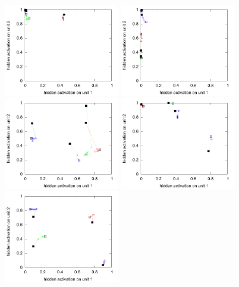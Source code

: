 \begin{figure}[h]
  \centering
  \includegraphics[width=0.45\textwidth]{img/hid-bal-bad-init.pdf}  
  \includegraphics[width=0.45\textwidth]{img/hid-bal-bad-convex.pdf}  \\
  \includegraphics[width=0.45\textwidth]{img/hid-bal-bad-step.pdf}  
  \includegraphics[width=0.45\textwidth]{img/hid-bal-bad-stagnation.pdf}  \\
  \includegraphics[width=0.45\textwidth]{img/hid-bal-good-init.pdf}  

\end{figure}
